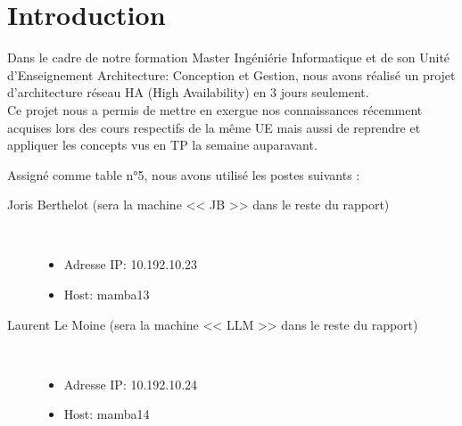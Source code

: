 \documentclass[11pt,a4paper]{report}
\begin{document}
    
    \newpage
    \setcounter{secnumdepth}{3}
    \setcounter{tocdepth}{4}
    \tableofcontents
    \newpage
    
        \section*{Introduction}
        
        
        Dans le cadre de notre formation Master Ingéniérie Informatique et de son Unité d'Enseignement Architecture: Conception et Gestion, nous avons réalisé un projet d'architecture réseau HA (High Availability) en 3 jours seulement.\\
        
        Ce projet nous a permis de mettre en exergue nos connaissances récemment acquises lors des cours respectifs de la même UE mais aussi de reprendre et appliquer les concepts vus en TP la semaine auparavant.
        
        
            Assigné comme table n°5, nous avons utilisé les postes suivants :\\
        
            \begin{description}
                \item[Joris Berthelot (sera la machine << JB >> dans le reste du rapport)] \hfill \\
                    \begin{itemize}
                        \item Adresse IP: 10.192.10.23
                        \item Host: mamba13
                    \end{itemize}
                \item[Laurent Le Moine (sera la machine << LLM >> dans le reste du rapport)] \hfill \\
                    \begin{itemize}
                        \item Adresse IP: 10.192.10.24
                        \item Host: mamba14
                    \end{itemize}
            \end{description}
            
\end{document}
